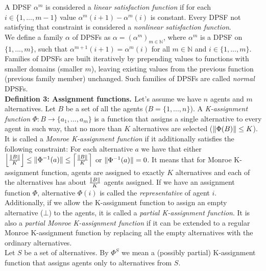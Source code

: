 A DPSF  $\alpha^{m}$ is considered a \textit{linear satisfaction function} if for each $i \in \{1,...,m-1\}$ value $\alpha^{m}(i+1) - \alpha^{m}(i)$ is constant. Every DPSF not satisfying that constraint is considered a \textit{nonlinear satisfaction function}.
\\

We define a family $\alpha$ of DPSFs as $\alpha = (\alpha^{m})_{m \in \mathbb{N}}$, where $\alpha^{m}$ is a DPSF on $\{1,...,m\}$, such that $\alpha^{m+1}(i+1) = \alpha^{m}(i)$ for all $m \in \mathbb{N}$ and $i \in \{1,...,m\}$. Families of DPSFs are built iteratively by prepending values to functions with smaller domains (smaller $m$), leaving existing values from the previous function (previous family member) unchanged. Such families of DPSFs are called \textit{normal} DPSFs.
\\

\noindent
\textbf{Definition 3: Assignment functions. \cite{1}} \hspace{.1in} Let's assume we have $n$ agents and $m$ alternatives. Let $B$ be a set of all the agents ($B = \{1,...,n\}$). A \textit{K-assignment function} $\Phi: B \rightarrow \{a_{1},...,a_{m}\}$ is a function that assigns a single alternative to every agent in such way, that no more than $K$ alternatives are selected ($\lVert\Phi(B)\rVert \leq K$). It is called a \textit{Monroe K-assignment function} if it additionally satisfies the following constraint: For each alternative $a$ we have that either $\left\lfloor \frac{\lVert B\rVert}{K} \right\rfloor \leq \lVert\Phi^{-1}(a)\rVert \leq \left\lceil \frac{\lVert B\rVert}{K} \right\rceil$ or $\lVert\Phi^{-1}(a)\rVert = 0$. It means that for Monroe K-assignment function, agents are assigned to exactly $K$ alternatives and each of the alternatives has about $\frac{\lVert B\rVert}{K}$ agents assigned. If we have an assignment function $\Phi$, alternative $\Phi(i)$ is called the \textit{representative} of agent $i$.
\\

Additionally, if we allow the K-assignment function to assign an empty alternative ($\bot$) to the agents, it is called a \textit{partial K-assignment function}. It is also a \textit{partial Monroe K-assignment function} if it can be extended to a regular Monroe K-assignment function by replacing all the empty alternatives with the ordinary alternatives.
\\

Let $S$ be a set of alternatives. By $\Phi^{S}$ we mean a (possibly partial) K-assignment function that assigns agents only to alternatives from $S$.
\\

